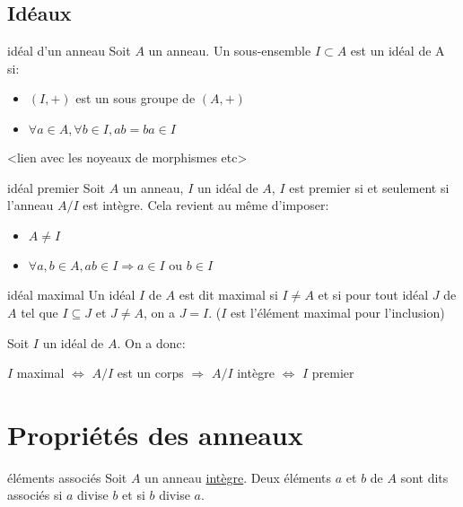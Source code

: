 \subsection{Idéaux}

\begin{definition}{idéal d'un anneau}{}
    Soit $A$ un anneau. Un sous-ensemble $I \subset A$ est un idéal de A si:
    \begin{itemize}
        \item $(I, +)$ est un sous groupe de $(A, +)$
        \item $\forall a \in A, \forall b \in I, ab = ba \in I$
    \end{itemize}
\end{definition}

<lien avec les noyeaux de morphismes etc>

\begin{definition}{idéal premier}{}
    Soit $A$ un anneau, $I$ un idéal de $A$, $I$ est premier si et seulement si l'anneau $A/I$ est intègre.
    Cela revient au même d'imposer:
    \begin{itemize}
        \item $A \neq I$
        \item $\forall a, b \in A, ab \in I \Longrightarrow a \in I$ ou $ b \in I$
    \end{itemize}
\end{definition}

\begin{definition}{idéal maximal}{}
    Un idéal $I$ de $A$ est dit maximal si $I \neq A$ et si pour tout idéal $J$ de $A$ tel que $I \subseteq J$ et $J \neq A$, on a $J = I$.
    ($I$ est l'élément maximal pour l'inclusion)
\end{definition}

\begin{proposition}{}{}
    Soit $I$ un idéal de $A$. On a donc:
    \begin{center}
        $I$ maximal $\Longleftrightarrow$ $A/I$ est un corps $\Longrightarrow$ $A/I$ intègre $\Longleftrightarrow$ $I$ premier
    \end{center}
\end{proposition}


\section{Propriétés des anneaux}

\begin{definition}{éléments associés}{}
    Soit $A$ un anneau \underline{intègre}.
    Deux éléments $a$ et $b$ de $A$ sont dits associés si $a$ divise $b$ et si $b$ divise $a$.
\end{definition}

